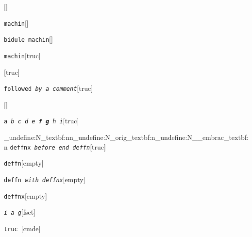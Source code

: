 \documentclass{book}
\begin{document}
%
\noindent\texttt{}\hfill[]



\noindent\texttt{machin}\hfill[]



%
\noindent\texttt{bidule machin}\hfill[]



%
\noindent\texttt{machin}\hfill[truc]



%
\noindent\texttt{}\hfill[truc]



\noindent\texttt{followed \EmbracOn{}\textnormal{\textsl{by a comment}}\EmbracOff{}}\hfill[truc]



%
\noindent\texttt{}\hfill[]



\noindent\texttt{a \EmbracOn{}\textnormal{\textsl{b c d e \textbf{f g} h i}}\EmbracOff{}}\hfill[truc]


\ExplSyntaxOn%
\cs_undefine:N{\embrac_textbf:nn}\cs_undefine:N{\embrac_orig_textbf:n}\cs_undefine:N{\__embrac_textbf:n}%
\ExplSyntaxOff%
%
\noindent\texttt{deffnx \EmbracOn{}\textnormal{\textsl{before end deffn}}\EmbracOff{}}\hfill[truc]



%


\noindent\texttt{deffn}\hfill[empty]



%

\noindent\texttt{deffn \EmbracOn{}\textnormal{\textsl{with deffnx}}\EmbracOff{}}\hfill[empty]



%
\noindent\texttt{deffnx}\hfill[empty]



%

\noindent\texttt{\textsl{i} \EmbracOn{}\textnormal{\textsl{a g}}\EmbracOff{}}\hfill[fset]



%
\noindent\texttt{truc \EmbracOn{}\textnormal{\textsl{}}\EmbracOff{}}\hfill[cmde]
\end{document}
